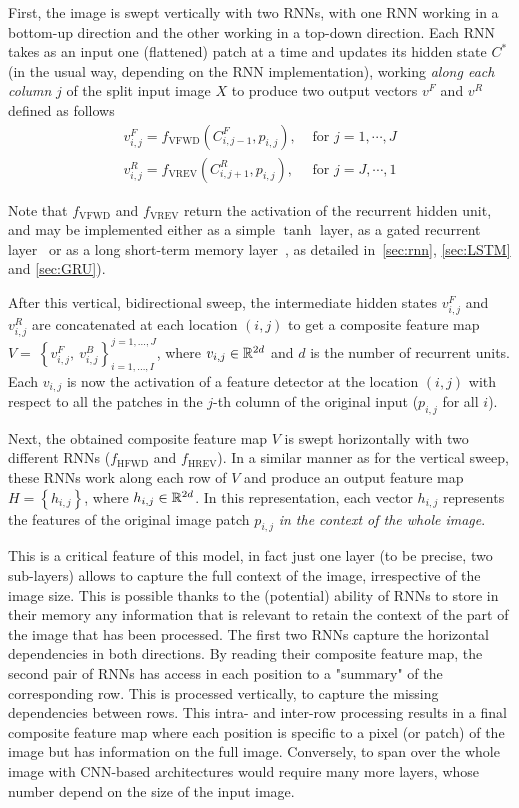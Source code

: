 First, the image is swept vertically with two RNNs, with one RNN working in
a bottom-up direction and the other working in a top-down direction.
Each RNN takes as an input one (flattened) patch at a time and updates its
hidden state $C^*$ (in the usual way, depending on the RNN implementation),
working \emph{along each column} $j$ of the split input image $X$ to produce
two output vectors $v^F$ and $v^R$ defined as follows
\begin{align}
    v^F_{i,j} = f_{\text{VFWD}}(C^F_{i,j-1},p_{i,j}), &\text{ for
    }j=1,\cdots, J\\
    v^R_{i,j} = f_{\text{VREV}}(C^R_{i,j+1},p_{i,j}), &\text{ for
    }j=J,\cdots,1
\end{align}

Note that $f_{\text{VFWD}}$ and $f_{\text{VREV}}$ return the activation of the
recurrent hidden unit, and may be implemented either as a simple $\tanh$
layer, as a gated recurrent layer~\citep{Cho2014} or as a long short-term
memory layer~\citep{Hochreiter+Schmidhuber-1997}, as detailed
in~\autoref{sec:rnn}, \autoref{sec:LSTM} and \autoref{sec:GRU}).

After this vertical, bidirectional sweep, the intermediate hidden states
$v^F_{i,j}$ and $v^R_{i,j}$ are concatenated at each location $(i,j)$ to get a
composite feature map $V=~\left\{v_{i,j}^F,~v_{i,j}^B\right\}_{
i=1,\ldots,I}^{ j=1,\ldots,J}$, where $v_{i,j} \in \mathbb{R}^{2d}$ and $d$ is the
number of recurrent units.  Each $v_{i,j}$ is now the activation of a feature
detector at the location $(i,j)$ with respect to all the patches in the $j$-th
column of the original input ($p_{i, j}$ for all $i$).

Next, the obtained composite feature map $V$ is swept horizontally with two
different RNNs ($f_{\text{HFWD}}$ and $f_{\text{HREV}}$). In a similar manner
as for the vertical sweep, these RNNs work along each row of $V$ and produce an
output feature map $H = \left\{ h_{i,j} \right\}$, where $h_{i,j} \in
\mathbb{R}^{2d}$. In this representation, each vector $h_{i,j}$ represents the
features of the original image patch $p_{i,j}$ \emph{in the context of the
whole image}.

This is a critical feature of this model, in fact just one layer (to be
precise, two sub-layers) allows to capture the full context of the image,
irrespective of the image size. This is possible thanks to the (potential)
ability of RNNs to store in their memory any information that is relevant to
retain the context of the part of the image that has been processed. The first
two RNNs capture the horizontal dependencies in both directions. By reading
their composite feature map, the second pair of RNNs has access in each
position to a "summary" of the corresponding row. This is processed vertically,
to capture the missing dependencies between rows. This intra- and inter-row
processing results in a final composite feature map where each position is
specific to a pixel (or patch) of the image but has information on the full
image. Conversely, to span over the whole image with CNN-based architectures
would require many more layers, whose number depend on the size of the input
image.

